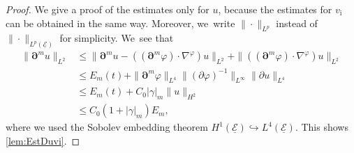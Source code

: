 \documentclass[JEP,XML,SOM,Unicode,NoFloatCountersInSection,published]{cedram}
\newcommand{\cE}{{\mathcal E}}
\newcommand{\ul}[1]{\underline{#1}}
\theoremstyle{definition}
\begin{document}
\begin{proof}
We give a proof of the estimates only for $u$, because the estimates for $v_\mathrm{i}$ can be obtained in the same way.
Moreover, we~write $\|\cdot\|_{L^p}$ instead of $\|\cdot\|_{L^p(\ul{\cE})}$ for simplicity. We~see that
\begin{align*}
\|\bm{\partial}^m u\|_{L^2}
&\leq \|\bm{\partial}^m u - ((\bm{\partial}^m\varphi)\cdot\nabla^\varphi)u\|_{L^2}
+ \|((\bm{\partial}^m\varphi)\cdot\nabla^\varphi)u\|_{L^2} \\
&\leq E_m(t) + \|\bm{\partial}^m\varphi\|_{L^4} \|(\partial\varphi)^{-1}\|_{L^\infty} \|\partial u\|_{L^4} \\
&\leq E_m(t) + C_0|\gamma|_m \|u\|_{H^2} \\
&\leq C_0(1+|\gamma|_m)E_m,
\end{align*}
where we used the Sobolev embedding theorem $H^1(\ul{\cE}) \hookrightarrow L^4(\ul{\cE})$.
This shows \eqref{lem:EstDuvi}.


\end{proof}
\end{document}
